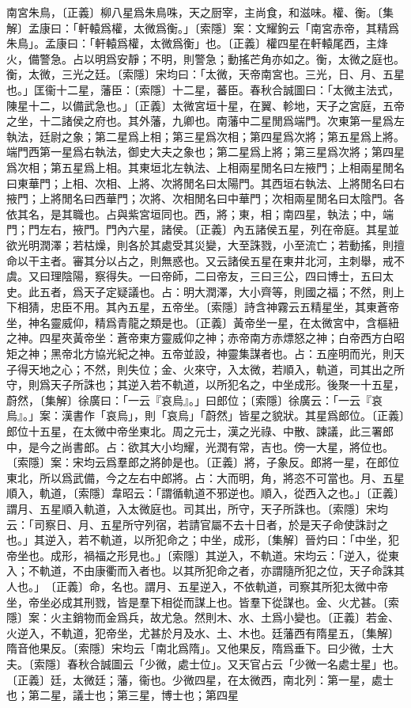 南宮朱鳥，〔正義〕柳八星爲朱鳥咮，天之厨宰，主尚食，和滋味。權、衡。〔集解〕孟康曰：「軒轅爲權，太微爲衡。」〔索隱〕案：文耀鉤云「南宮赤帝，其精爲朱鳥」。孟康曰：「軒轅爲權，太微爲衡」也。〔正義〕權四星在軒轅尾西，主烽火，備警急。占以明爲安靜；不明，則警急；動搖芒角亦如之。衡，太微之庭也。衡，太微，三光之廷。〔索隱〕宋均曰：「太微，天帝南宮也。三光，日、月、五星也。」匡衞十二星，藩臣：〔索隱〕十二星，蕃臣。春秋合誠圖曰：「太微主法式，陳星十二，以備武急也。」〔正義〕太微宮垣十星，在翼、軫地，天子之宮庭，五帝之坐，十二諸侯之府也。其外藩，九卿也。南藩中二星閒爲端門。次東第一星爲左執法，廷尉之象；第二星爲上相；第三星爲次相；第四星爲次將；第五星爲上將。端門西第一星爲右執法，御史大夫之象也；第二星爲上將；第三星爲次將；第四星爲次相；第五星爲上相。其東垣北左執法、上相兩星閒名曰左掖門；上相兩星閒名曰東華門；上相、次相、上將、次將閒名曰太陽門。其西垣右執法、上將閒名曰右掖門；上將閒名曰西華門；次將、次相閒名曰中華門；次相兩星閒名曰太陰門。各依其名，是其職也。占與紫宮垣同也。西，將；東，相；南四星，執法；中，端門；門左右，掖門。門內六星，諸侯。〔正義〕內五諸侯五星，列在帝庭。其星並欲光明潤澤；若枯燥，則各於其處受其災變，大至誅戮，小至流亡；若動搖，則擅命以干主者。審其分以占之，則無惑也。又云諸侯五星在東井北河，主刺舉，戒不虞。又曰理陰陽，察得失。一曰帝師，二曰帝友，三曰三公，四曰博士，五曰太史。此五者，爲天子定疑議也。占：明大潤澤，大小齊等，則國之福；不然，則上下相猜，忠臣不用。其內五星，五帝坐。〔索隱〕詩含神霧云五精星坐，其東蒼帝坐，神名靈威仰，精爲青龍之類是也。〔正義〕黃帝坐一星，在太微宮中，含樞紐之神。四星夾黃帝坐：蒼帝東方靈威仰之神；赤帝南方赤熛怒之神；白帝西方白昭矩之神；黑帝北方協光紀之神。五帝並設，神靈集謀者也。占：五座明而光，則天子得天地之心；不然，則失位；金、火來守，入太微，若順入，軌道，司其出之所守，則爲天子所誅也；其逆入若不軌道，以所犯名之，中坐成形。後聚一十五星，蔚然，〔集解〕徐廣曰：「一云『哀烏』。」曰郎位；〔索隱〕徐廣云：「一云『哀烏』。」案：漢書作「哀烏」，則「哀烏」「蔚然」皆星之貌狀。其星爲郎位。〔正義〕郎位十五星，在太微中帝坐東北。周之元士，漢之光祿、中散、諫議，此三署郎中，是今之尚書郎。占：欲其大小均耀，光潤有常，吉也。傍一大星，將位也。〔索隱〕案：宋均云爲羣郎之將帥是也。〔正義〕將，子象反。郎將一星，在郎位東北，所以爲武備，今之左右中郎將。占：大而明，角，將恣不可當也。月、五星順入，軌道，〔索隱〕韋昭云：「謂循軌道不邪逆也。順入，從西入之也。」〔正義〕謂月、五星順入軌道，入太微庭也。司其出，所守，天子所誅也。〔索隱〕宋均云：「司察日、月、五星所守列宿，若請官屬不去十日者，於是天子命使誅討之也。」其逆入，若不軌道，以所犯命之；中坐，成形，〔集解〕晉灼曰：「中坐，犯帝坐也。成形，禍福之形見也。」〔索隱〕其逆入，不軌道。宋均云：「逆入，從東入；不軌道，不由康衢而入者也。以其所犯命之者，亦謂隨所犯之位，天子命誅其人也。」　〔正義〕命，名也。謂月、五星逆入，不依軌道，司察其所犯太微中帝坐，帝坐必成其刑戮，皆是羣下相從而謀上也。皆羣下從謀也。金、火尤甚。〔索隱〕案：火主銷物而金爲兵，故尤急。然則木、水、土爲小變也。〔正義〕若金、火逆入，不軌道，犯帝坐，尤甚於月及水、土、木也。廷藩西有隋星五，〔集解〕隋音他果反。〔索隱〕宋均云「南北爲隋」。又他果反，隋爲垂下。曰少微，士大夫。〔索隱〕春秋合誠圖云「少微，處士位」。又天官占云「少微一名處士星」也。〔正義〕廷，太微廷；藩，衞也。少微四星，在太微西，南北列：第一星，處士也；第二星，議士也；第三星，博士也；第四星